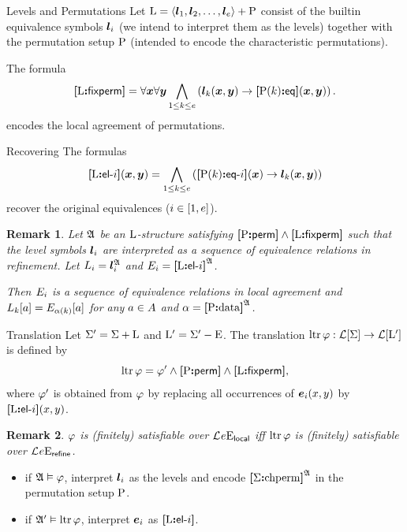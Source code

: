 \documentclass{beamer}
\newtheorem{remark}{Remark}
\begin{document}
\begin{frame}{Levels and Permutations}
Let ${\mathrm{L}} = \left\langle \bm{l}_{1},\bm{l}_{2},\dots,\bm{l}_{e} \right\rangle + {\mathrm{P}}$ consist of the builtin
equivalence symbols $\bm{l}_{i}$ (we intend to interpret them as the levels)
together with the permutation setup ${\mathrm{P}}$ (intended to encode the
characteristic permutations).

The formula
\[
  {\bm{[}{\mathrm{L}}\mathord{\bm{:}}\mathsf{fixperm}\bm{]}} = \forall\bm{x} \forall\bm{y} \bigwedge_{1 \leq k \leq e}
  \left(\bm{l}_{k}(\bm{x},\bm{y}) \rightarrow {\bm{[}{\mathrm{P}}(k)\mathord{\bm{:}}\mathsf{eq}\bm{]}}(\bm{x},\bm{y})\right).
\]
encodes the local agreement of permutations.
\end{frame}

\begin{frame}{Recovering}
The formulas
\[
  {\bm{[}{\mathrm{L}}\mathord{\bm{:}}\mathsf{el}{\hbox{-}}i\bm{]}}(\bm{x},\bm{y}) = \bigwedge_{1 \leq k \leq e}
  \left({\bm{[}{\mathrm{P}}(k)\mathord{\bm{:}}\mathsf{eq}{\hbox{-}}i\bm{]}}(\bm{x}) \rightarrow \bm{l}_{k}(\bm{x},\bm{y})\right)
\]
recover the original equivalences ($i\in[1,e]$).
\begin{remark}
Let $\mathfrak{A}$ be an ${\mathrm{L}}$-structure satisfying
${\bm{[}{\mathrm{P}}\mathord{\bm{:}}\mathsf{perm}\bm{]}}\land{\bm{[}{\mathrm{L}}\mathord{\bm{:}}\mathsf{fixperm}\bm{]}}$ such that the level symbols $\bm{l}_{i}$ are
interpreted as a sequence of equivalence relations in refinement.
Let $L_{i} = \bm{l}_{i}^{\mathfrak{A}}$ and $E_{i} = {\bm{[}{\mathrm{L}}\mathord{\bm{:}}\mathsf{el}{\hbox{-}}i\bm{]}}^{\mathfrak{A}}$.

Then $E_{i}$ is a sequence of equivalence relations in local agreement and
$L_{k}[a] = E_{\alpha(k)}[a]$ for any $a\in A$ and $\alpha =
{\bm{[}{\mathrm{P}}\mathord{\bm{:}}\mathrm{data}\bm{]}}^{\mathfrak{A}}$.
\end{remark}
\end{frame}

\begin{frame}{Translation}
Let $\Sigma' = \Sigma + {\mathrm{L}}$ and ${\mathrm{L}}' = \Sigma' - {\mathrm{E}}$.
The translation $\operatorname{ltr}\varphi : \mathcal{L}[\Sigma] \to \mathcal{L}[{{\mathrm{L}}'}]$ is defined by
\[
  \operatorname{ltr}\varphi = {\varphi'} \land {\bm{[}{\mathrm{P}}\mathord{\bm{:}}\mathsf{perm}\bm{]}} \land {\bm{[}{\mathrm{L}}\mathord{\bm{:}}\mathsf{fixperm}\bm{]}},
\]
where ${\varphi'}$ is obtained from $\varphi$ by replacing all occurrences
of $\bm{e}_{i}(x,y)$ by ${\bm{[}{\mathrm{L}}\mathord{\bm{:}}\mathsf{el}{\hbox{-}}i\bm{]}}(x,y)$.
\begin{remark}
$\varphi$ is (finitely) satisfiable over $\mathcal{L}^{{}}_{{}}{e}\mathrm{E}_{\mathsf{local}}$ iff
$\operatorname{ltr}\varphi$ is (finitely) satisfiable over
$\mathcal{L}^{{}}_{{}}{e}\mathrm{E}_{\mathsf{refine}}$.
\end{remark}
\begin{itemize}
  \item
  if $\mathfrak{A}\vDash\varphi$, interpret $\bm{l}_{i}$ as the levels and encode
  ${\bm{[}\Sigma\mathord{\bm{:}}\mathrm{chperm}\bm{]}}^{\mathfrak{A}}$ in the permutation setup ${\mathrm{P}}$.
  
  \item
  if $\mathfrak{A'}\vDash\operatorname{ltr}\varphi$, interpret $\bm{e}_{i}$ as ${\bm{[}{\mathrm{L}}\mathord{\bm{:}}\mathsf{el}{\hbox{-}}i\bm{]}}$.
\end{itemize}
\end{frame}
\end{document}
